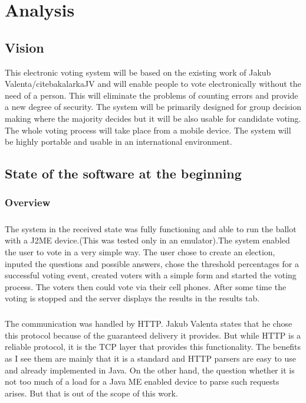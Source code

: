 \documentclass[11pt,twoside,a4paper]{book}
\begin{document}
\chapter{Analysis}
\section{Vision}
This electronic voting system will be based on the existing work of Jakub Valenta/cite{bakalarkaJV} and will enable people to vote electronically without the need of a person. This will eliminate the problems of counting errors and provide a new degree of security. The system will be primarily designed for group decision making where the majority decides but it will be also usable for candidate voting. The whole voting process will take place from a mobile device. The system will be highly portable and usable in an international environment.
\section{State of the software at the beginning}
\subsection{Overview}
\paragraph{}
The system in the received state was fully functioning and able to run the ballot with a J2ME device.(This was tested only in an emulator).The system enabled the user to vote in a very simple way. The user chose to create an election, inputed the questions and possible answers, chose the threshold percentages for a successful voting event, created voters with a simple form and started the voting process. The voters then could vote via their cell phones. After some time the voting is stopped and the server displays the results in the results tab. \paragraph{}
The communication was handled by HTTP. Jakub Valenta\cite{bakalarkaJV} states that he chose this protocol because of the guaranteed delivery it provides. But while HTTP is a reliable protocol, it is the TCP layer that provides this functionality. The benefits as I see them are mainly that it is a standard and HTTP parsers are easy to use and already implemented in Java. On the other hand, the question whether it is not too much of a load for a Java ME enabled device to parse such requests arises. But that is out of the scope of this work.
\end{document}

